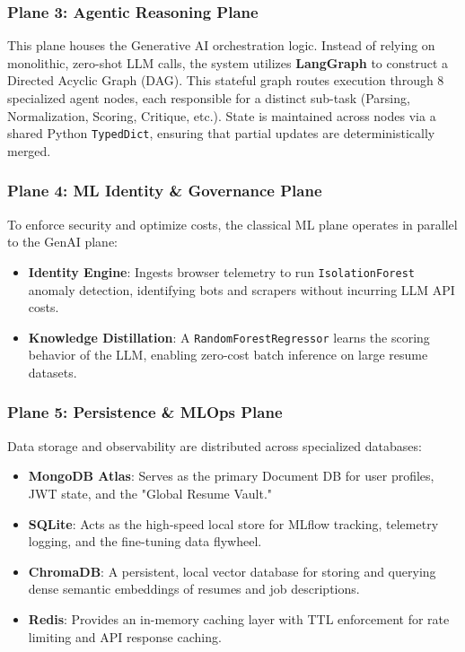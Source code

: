 \subsubsection{Plane 3: Agentic Reasoning Plane}
This plane houses the Generative AI orchestration logic. Instead of relying on monolithic, zero-shot LLM calls, the system utilizes \textbf{LangGraph} to construct a Directed Acyclic Graph (DAG). This stateful graph routes execution through 8 specialized agent nodes, each responsible for a distinct sub-task (Parsing, Normalization, Scoring, Critique, etc.). State is maintained across nodes via a shared Python \texttt{TypedDict}, ensuring that partial updates are deterministically merged.

\subsubsection{Plane 4: ML Identity \& Governance Plane}
To enforce security and optimize costs, the classical ML plane operates in parallel to the GenAI plane:
\begin{itemize}
    \item \textbf{Identity Engine}: Ingests browser telemetry to run \texttt{IsolationForest} anomaly detection, identifying bots and scrapers without incurring LLM API costs.
    \item \textbf{Knowledge Distillation}: A \texttt{RandomForestRegressor} learns the scoring behavior of the LLM, enabling zero-cost batch inference on large resume datasets.
\end{itemize}

\subsubsection{Plane 5: Persistence \& MLOps Plane}
Data storage and observability are distributed across specialized databases:
\begin{itemize}
    \item \textbf{MongoDB Atlas}: Serves as the primary Document DB for user profiles, JWT state, and the "Global Resume Vault."
    \item \textbf{SQLite}: Acts as the high-speed local store for MLflow tracking, telemetry logging, and the fine-tuning data flywheel.
    \item \textbf{ChromaDB}: A persistent, local vector database for storing and querying dense semantic embeddings of resumes and job descriptions.
    \item \textbf{Redis}: Provides an in-memory caching layer with TTL enforcement for rate limiting and API response caching.
\end{itemize}

